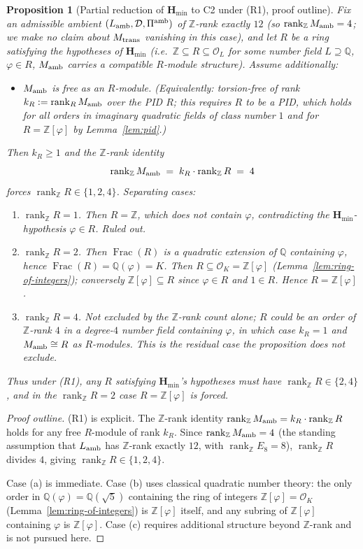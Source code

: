 \documentclass[11pt, a4paper]{amsart}
\newtheorem{proposition}[theorem]{Proposition}
\theoremstyle{definition}
\newcommand{\Q}{\mathbb{Q}}
\newcommand{\Z}{\mathbb{Z}}
\newcommand{\rk}{\operatorname{rank}}
\newcommand{\Frac}{\operatorname{Frac}}
\newcommand{\Hmin}{\mathbf{H}_{\min}}
\newcommand{\Ophi}{\mathbb{Z}[\varphi]}
\begin{document}
\begin{proposition}[Partial reduction of $\Hmin$ to C2 under
  (R1), proof outline]
\label{prop:reduction}
Fix an admissible ambient $(L_{\rm amb}, \mathcal{D},
\Pi^{\rm amb})$ of $\Z$-rank exactly $12$ (so $\rk_\Z M_{\rm
amb} = 4$; we make no claim about $M_{\rm trans}$ vanishing
in this case), and let $R$ be a ring satisfying the
hypotheses of $\Hmin$ (i.e.\
$\Z \subseteq R \subseteq \mathcal{O}_L$ for some number field
$L \supseteq \Q$, $\varphi \in R$, $M_{\rm amb}$ carries a
compatible $R$-module structure). Assume additionally:
\begin{itemize}
\item[\textup{(R1)}] $M_{\rm amb}$ is \emph{free} as an
  $R$-module. (Equivalently: torsion-free of rank $k_R :=
  \rk_R M_{\rm amb}$ over the PID $R$; this requires $R$ to be
  a PID, which holds for all orders in imaginary quadratic
  fields of class number $1$ and for $R = \Ophi$ by
  Lemma~\ref{lem:pid}.)
\end{itemize}
Then $k_R \geq 1$ and the $\Z$-rank identity
\[
  \rk_\Z M_{\rm amb}
  \;=\; k_R \cdot \rk_\Z R
  \;=\; 4
\]
forces $\rk_\Z R \in \{1, 2, 4\}$. Separating cases:
\begin{enumerate}
\item[\textup{(a)}] $\rk_\Z R = 1$. Then $R = \Z$, which does
  not contain $\varphi$, contradicting the $\Hmin$-hypothesis
  $\varphi \in R$. Ruled out.
\item[\textup{(b)}] $\rk_\Z R = 2$. Then $\Frac(R)$ is a
  quadratic extension of $\Q$ containing $\varphi$, hence
  $\Frac(R) = \Q(\varphi) = K$. Then $R \subseteq \mathcal{O}_K
  = \Ophi$ (Lemma~\ref{lem:ring-of-integers}); conversely
  $\Ophi \subseteq R$ since $\varphi \in R$ and $1 \in R$. Hence
  $R = \Ophi$.
\item[\textup{(c)}] $\rk_\Z R = 4$. Not excluded by the
  $\Z$-rank count alone; $R$ could be an order of $\Z$-rank $4$
  in a degree-$4$ number field containing $\varphi$, in which
  case $k_R = 1$ and $M_{\rm amb} \cong R$ as $R$-modules. This
  is the residual case the proposition does not exclude.
\end{enumerate}
Thus under (R1), any $R$ satisfying $\Hmin$'s hypotheses must
have $\rk_\Z R \in \{2, 4\}$, and in the $\rk_\Z R = 2$ case
$R = \Ophi$ is forced.
\end{proposition}

\begin{proof}[Proof outline]
(R1) is explicit. The $\Z$-rank identity
$\rk_\Z M_{\rm amb} = k_R \cdot \rk_\Z R$ holds for any free
$R$-module of rank $k_R$. Since $\rk_\Z M_{\rm amb} = 4$ (the
standing assumption that $L_{\rm amb}$ has $\Z$-rank exactly
$12$, with $\rk_\Z E_8 = 8$), $\rk_\Z R$ divides $4$, giving
$\rk_\Z R \in \{1, 2, 4\}$.

Case (a) is immediate. Case (b) uses classical quadratic
number theory: the only order in $\Q(\varphi) = \Q(\sqrt 5)$
containing the ring of integers $\Ophi = \mathcal O_K$
(Lemma~\ref{lem:ring-of-integers}) is $\Ophi$ itself, and any
subring of $\Ophi$ containing $\varphi$ is $\Ophi$. Case (c)
requires additional structure beyond $\Z$-rank and is not
pursued here.
\end{proof}
\end{document}

